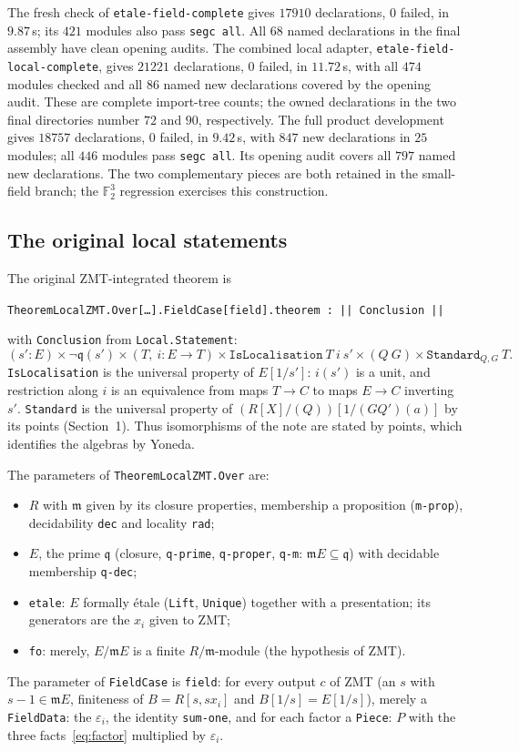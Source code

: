 \documentclass[11pt]{amsart}
\numberwithin{equation}{section}
\theoremstyle{definition}
\theoremstyle{remark}
\newcommand{\m}{\mathfrak m}
\newcommand{\q}{\mathfrak q}
\newcommand{\code}[1]{\texttt{#1}}
\begin{document}
The fresh check of \code{etale-field-complete} gives $17910$
declarations, $0$ failed, in $9.87$\,s; its $421$ modules also pass
\code{segc all}. All $68$ named declarations in the final assembly
have clean opening audits. The combined local adapter,
\code{etale-field-local-complete}, gives $21221$ declarations,
$0$ failed, in $11.72$\,s, with all $474$ modules checked and all $86$
named new declarations covered by the opening audit. These are complete
import-tree counts; the owned declarations in the two final directories
number $72$ and $90$, respectively.
The full product development gives $18757$ declarations, $0$ failed,
in $9.42$\,s, with $847$ new declarations in $25$ modules; all $446$
modules pass \code{segc all}. Its opening audit covers all $797$ named
new declarations. The two complementary pieces are both retained in
the small-field branch; the $\mathbb F_2^3$ regression exercises this
construction.

\subsection{The original local statements}
The original ZMT-integrated theorem is
\begin{center}
\code{TheoremLocalZMT.Over[\ldots].FieldCase[field].theorem
 : || Conclusion ||}
\end{center}
with \code{Conclusion} from \code{Local.Statement}:
\[
 (s'\!:E)\times\neg\q(s')\times(T,\ i:E\to T)\times
 \code{IsLocalisation}\ T\ i\ s'\times(Q\ G)\times
 \code{Standard}_{Q,G}\ T .
\]
\code{IsLocalisation} is the universal property of $E[1/s']$: $i(s')$
is a unit, and restriction along $i$ is an equivalence from maps
$T\to C$ to maps $E\to C$ inverting $s'$. \code{Standard} is the
universal property of $(R[X]/(Q))[1/(GQ')(a)]$ by its points
(Section~1). Thus isomorphisms of the note are stated by points, which
identifies the algebras by Yoneda.

The parameters of \code{TheoremLocalZMT.Over} are:
\begin{itemize}
\item $R$ with $\m$ given by its closure properties, membership a
proposition (\code{m-prop}), decidability \code{dec} and locality
\code{rad};
\item $E$, the prime $\q$ (closure, \code{q-prime}, \code{q-proper},
\code{q-m}: $\m E\subseteq\q$) with decidable membership \code{q-dec};
\item \code{etale}: $E$ formally \'etale (\code{Lift}, \code{Unique})
together with a presentation; its generators are the $x_i$ given to ZMT;
\item \code{fo}: merely, $E/\m E$ is a finite $R/\m$-module (the
hypothesis of ZMT).
\end{itemize}
The parameter of \code{FieldCase} is \code{field}: for every output
$c$ of ZMT (an $s$ with $s-1\in\m E$, finiteness of
$B=R[s,sx_i]$ and $B[1/s]=E[1/s]$), merely a \code{FieldData}:
the $\varepsilon_i$, the identity \code{sum-one}, and for each factor a
\code{Piece}: $P$ with the three facts~\eqref{eq:factor} multiplied by
$\varepsilon_i$.
\end{document}
